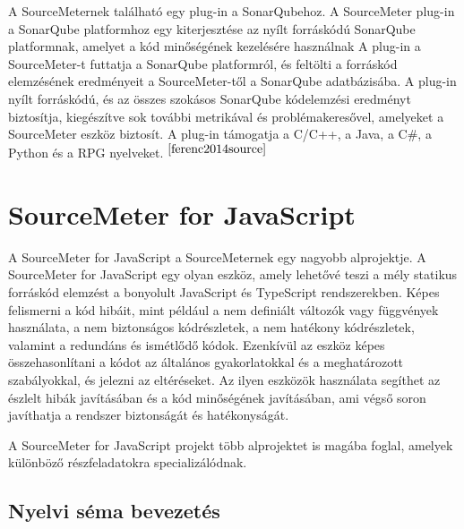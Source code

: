 \noindent

A SourceMeternek található egy plug-in a SonarQubehoz.
A SourceMeter plug-in a SonarQube platformhoz egy kiterjesztése az nyílt forráskódú SonarQube platformnak, amelyet a kód minőségének kezelésére használnak
A plug-in a SourceMeter-t futtatja a SonarQube platformról, és feltölti a forráskód elemzésének eredményeit a SourceMeter-től a SonarQube adatbázisába.
A plug-in nyílt forráskódú, és az összes szokásos SonarQube kódelemzési eredményt biztosítja, kiegészítve sok további metrikával és problémakeresővel, amelyeket a SourceMeter eszköz biztosít.
A plug-in támogatja a C/C++, a Java, a C\#, a Python és a RPG nyelveket.$^{~\cite{ferenc2014source}}$

\section{SourceMeter for JavaScript}

\noindent

A SourceMeter for JavaScript a SourceMeternek egy nagyobb alprojektje.
A SourceMeter for JavaScript egy olyan eszköz, amely lehetővé teszi a mély statikus forráskód elemzést a bonyolult JavaScript és TypeScript rendszerekben.
Képes felismerni a kód hibáit, mint például a nem definiált változók vagy függvények használata, a nem biztonságos kódrészletek, a nem hatékony kódrészletek, valamint a redundáns és ismétlődő kódok.
Ezenkívül az eszköz képes összehasonlítani a kódot az általános gyakorlatokkal és a meghatározott szabályokkal, és jelezni az eltéréseket.
Az ilyen eszközök használata segíthet az észlelt hibák javításában és a kód minőségének javításában, ami végső soron javíthatja a rendszer biztonságát és hatékonyságát.

\noindent

A SourceMeter for JavaScript projekt több alprojektet is magába foglal, amelyek különböző részfeladatokra specializálódnak.

\subsection{Nyelvi séma bevezetés}\label{chap:nyelvi_sema}

